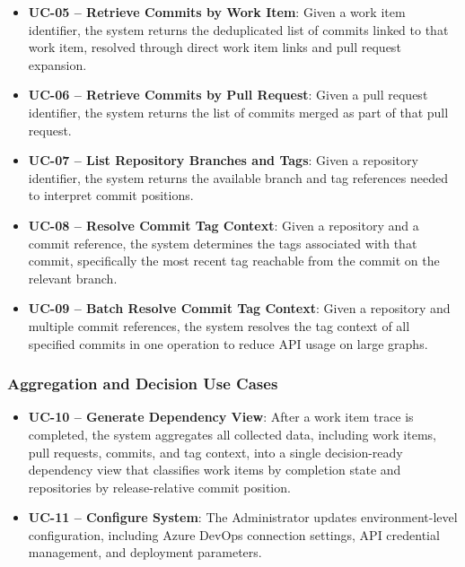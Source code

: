 \begin{itemize}
  \item \textbf{UC-05 -- Retrieve Commits by Work Item}: Given a work item identifier, the system returns the deduplicated list of commits linked to that work item, resolved through direct work item links and pull request expansion.

  \item \textbf{UC-06 -- Retrieve Commits by Pull Request}: Given a pull request identifier, the system returns the list of commits merged as part of that pull request.

  \item \textbf{UC-07 -- List Repository Branches and Tags}: Given a repository identifier, the system returns the available branch and tag references needed to interpret commit positions.

  \item \textbf{UC-08 -- Resolve Commit Tag Context}: Given a repository and a commit reference, the system determines the tags associated with that commit, specifically the most recent tag reachable from the commit on the relevant branch.

  \item \textbf{UC-09 -- Batch Resolve Commit Tag Context}: Given a repository and multiple commit references, the system resolves the tag context of all specified commits in one operation to reduce API usage on large graphs.
\end{itemize}

\subsubsection{Aggregation and Decision Use Cases}

\begin{itemize}
  \item \textbf{UC-10 -- Generate Dependency View}: After a work item trace is completed, the system aggregates all collected data, including work items, pull requests, commits, and tag context, into a single decision-ready dependency view that classifies work items by completion state and repositories by release-relative commit position.

  \item \textbf{UC-11 -- Configure System}: The Administrator updates environment-level configuration, including Azure DevOps connection settings, API credential management, and deployment parameters.
\end{itemize}

